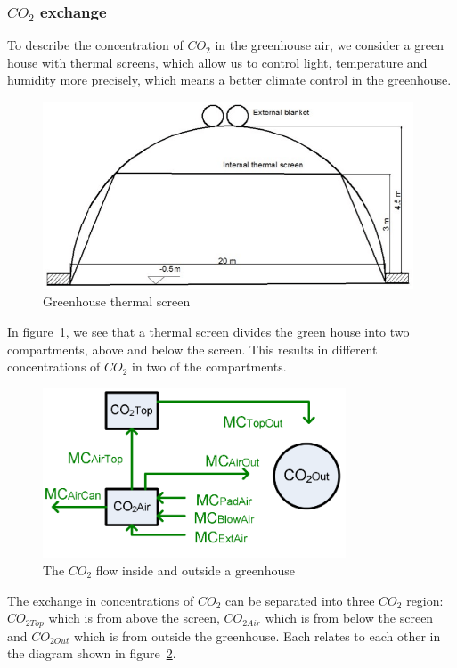 \documentclass[a4paper]{article}
\begin{document}
\subsubsection{\(CO_2\) exchange}
To describe the concentration of \(CO_2\) in the greenhouse air, we consider a green house with thermal screens, which allow us to control light, temperature and humidity more precisely, which means a better climate control in the greenhouse.
\begin{figure}[H]
  \centering
  \includegraphics[width=11cm]{thrscr.png}
  \caption{Greenhouse thermal screen}\label{fig:thrscr}
\end{figure}

In figure~\ref{fig:thrscr}, we see that a thermal screen divides the green house into two compartments, above and below the screen.
This results in different concentrations of \(CO_2\) in two of the compartments.
\begin{figure}[H]
  \centering
  \includegraphics[width=9cm]{CO2}
  \caption{The \(CO_2\) flow inside and outside a greenhouse}\label{fig:CO2}
\end{figure}

The exchange in concentrations of \(CO_2\) can be separated into three \(CO_2\) region: \(CO_{2Top}\) which is from above the screen, \(CO_{2Air}\) which is from below the screen and \(CO_{2Out}\) which is from outside the greenhouse.
Each relates to each other in the diagram shown in figure~\ref{fig:CO2}.
\end{document}
